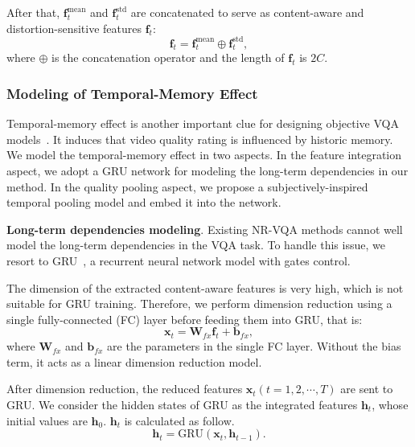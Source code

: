 \documentclass[twocolumn]{svjour3}          \smartqed  \usepackage{graphicx}
\begin{document}
After that, $\mathbf{f}_{t}^{\mathrm{mean}}$ and $\mathbf{f}_{t}^{\mathrm{std}}$ are concatenated to serve as content-aware and distortion-sensitive features $\mathbf{f}_t$:
\begin{equation}\label{eq:concatenation}
\mathbf{f}_t = \mathbf{f}_{t}^{\mathrm{mean}}\oplus\mathbf{f}_{t}^{\mathrm{std}},
\end{equation}
where \(\oplus\) is the concatenation operator and the length of $\mathbf{f}_t$ is $2C$.

\subsubsection{Modeling of Temporal-Memory Effect}
Temporal-memory effect is another important clue for designing objective VQA models~\citep{park2013video,seshadrinathan2011temporal, xu2014no,choi2018video,kim2018deep}. 
It induces that video quality rating is influenced by historic memory.
We model the temporal-memory effect in two aspects. 
In the feature integration aspect, we adopt a GRU network for modeling the long-term dependencies in our method. 
In the quality pooling aspect, we propose a subjectively-inspired temporal pooling model and embed it into the network.

\textbf{Long-term dependencies modeling}.
Existing NR-VQA methods cannot well model the long-term dependencies in the VQA task. 
To handle this issue, we resort to GRU~\citep{cho2014learning}, a recurrent neural network model with gates control. 

The dimension of the extracted content-aware features is very high, which is not suitable for GRU training. 
Therefore, we perform dimension reduction using a single fully-connected (FC) layer before feeding them into GRU,  that is:
\begin{equation}\label{eq:linear DR}
\mathbf{x}_t = \mathbf{W}_{fx}\mathbf{f}_t+\mathbf{b}_{fx},
\end{equation}
where $\mathbf{W}_{fx}$ and $\mathbf{b}_{fx}$ are the parameters in the single FC layer. 
Without the bias term, it acts as a linear dimension reduction model.

After dimension reduction, the reduced features $\mathbf{x}_t (t=1, 2, \cdots, T)$ are sent to GRU. 
We consider the hidden states of GRU as the integrated features $\mathbf{h}_t$, whose initial values are $\mathbf{h}_0$.  $\mathbf{h}_t$ is calculated as follow.
\begin{equation}\label{eq:GRU}
\mathbf{h}_t = \mathrm{GRU}(\mathbf{x}_t, \mathbf{h}_{t-1}).
\end{equation}
\end{document}
